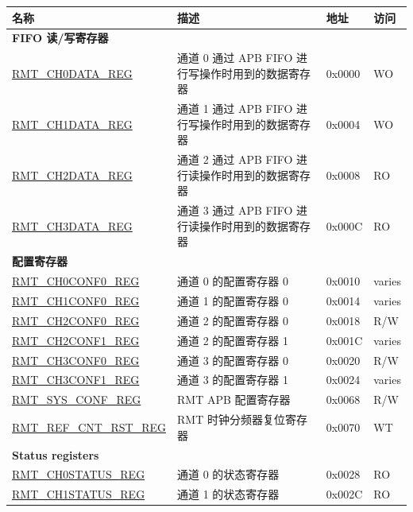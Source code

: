 \begin{longtable}{ | p{6cm} | p{7.2cm} | p{1.3cm} | p{1cm} | }
\hline\rowcolor{lightgray}
名称 & 描述 & 地址 & 访问 \\ \hline
\endhead
\multicolumn{4}{|l|}{\textbf{FIFO 读/写寄存器}} \\ \hline
\hyperref[regdesc:RMTCHNDATAREG]{RMT\_CH0DATA\_REG} & 通道 0 通过 APB FIFO 进行写操作时用到的数据寄存器 & 0x0000 & WO \\ \hline
\hyperref[regdesc:RMTCHNDATAREG]{RMT\_CH1DATA\_REG} & 通道 1 通过 APB FIFO 进行写操作时用到的数据寄存器 & 0x0004 & WO \\ \hline
\hyperref[regdesc:RMTCHMDATAREG]{RMT\_CH2DATA\_REG} & 通道 2 通过 APB FIFO 进行读操作时用到的数据寄存器 & 0x0008 & RO \\ \hline
\hyperref[regdesc:RMTCHMDATAREG]{RMT\_CH3DATA\_REG} & 通道 3 通过 APB FIFO 进行读操作时用到的数据寄存器 & 0x000C & RO \\ \hline
\multicolumn{4}{|l|}{\textbf{配置寄存器}} \\ \hline
\hyperref[regdesc:RMTCHNCONF0REG]{RMT\_CH0CONF0\_REG} & 通道 0 的配置寄存器 0 & 0x0010 & varies \\ \hline
\hyperref[regdesc:RMTCHNCONF0REG]{RMT\_CH1CONF0\_REG} & 通道 1 的配置寄存器 0 & 0x0014 & varies \\ \hline
\hyperref[regdesc:RMTCHMCONF0REG]{RMT\_CH2CONF0\_REG} & 通道 2 的配置寄存器 0 & 0x0018 & R/W \\ \hline
\hyperref[regdesc:RMTCHMCONF1REG]{RMT\_CH2CONF1\_REG} & 通道 2 的配置寄存器 1 & 0x001C & varies \\ \hline
\hyperref[regdesc:RMTCHMCONF0REG]{RMT\_CH3CONF0\_REG} & 通道 3 的配置寄存器 0 & 0x0020 & R/W \\ \hline
\hyperref[regdesc:RMTCHMCONF1REG]{RMT\_CH3CONF1\_REG} & 通道 3 的配置寄存器 1 & 0x0024 & varies \\ \hline
\hyperref[regdesc:RMTSYSCONFREG]{RMT\_SYS\_CONF\_REG} & RMT APB 配置寄存器 & 0x0068 & R/W \\ \hline
\hyperref[regdesc:RMTREFCNTRSTREG]{RMT\_REF\_CNT\_RST\_REG} & RMT 时钟分频器复位寄存器 & 0x0070 & WT \\ \hline
\multicolumn{4}{|l|}{\textbf{Status registers}} \\ \hline
\hyperref[regdesc:RMTCHNSTATUSREG]{RMT\_CH0STATUS\_REG} & 通道 0 的状态寄存器 & 0x0028 & RO \\ \hline
\hyperref[regdesc:RMTCHNSTATUSREG]{RMT\_CH1STATUS\_REG} & 通道 1 的状态寄存器 & 0x002C & RO \\ \hline

\end{longtable}
